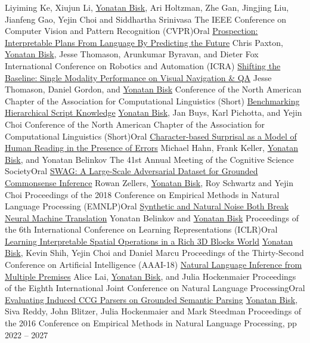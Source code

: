 \documentclass[10pt,letter]{moderncv}
\newcommand{\YB}{\underline{Yonatan Bisk}}
\begin{document}
  {Liyiming Ke, Xiujun Li, \YB{}, Ari Holtzman, Zhe Gan, Jingjing Liu, Jianfeng Gao, Yejin Choi and Siddhartha Srinivasa}
  {The IEEE Conference on Computer Vision and Pattern Recognition (CVPR)}{Oral}{}
\pub{--}
  {\href{https://arxiv.org/abs/1903.08309}{Prospection: Interpretable Plans From Language By Predicting the Future}}
  {Chris Paxton, \YB{}, Jesse Thomason, Arunkumar Byravan, and Dieter Fox}
  {International Conference on Robotics and Automation (ICRA)}{}{}
\pub{--}
  {\href{https://arxiv.org/abs/1811.00613}{Shifting the Baseline: Single Modality Performance on Visual Navigation \& QA}}
  {Jesse Thomason, Daniel Gordon, and \YB{}}
  {Conference of the North American Chapter of the Association for Computational Linguistics (Short)}{}{}
\pub{--}
  {\href{https://www.aclweb.org/anthology/N19-1412}{Benchmarking Hierarchical Script Knowledge}}
  {\YB{}, Jan Buys, Karl Pichotta, and Yejin Choi}
  {Conference of the North American Chapter of the Association for Computational Linguistics (Short)}{Oral}{}
\pub{--}
  {\href{https://arxiv.org/abs/1902.00595}{Character-based Surprisal as a Model of Human Reading in the Presence of Errors}}
  {Michael Hahn, Frank Keller, \YB{}, and Yonatan Belinkov}
  {The 41st Annual Meeting of the Cognitive Science Society}{Oral}{}
  {\href{http://rowanzellers.com/swag/}{SWAG: A Large-Scale Adversarial Dataset for Grounded Commonsense Inference}}
  {Rowan Zellers, \YB{}, Roy Schwartz and Yejin Choi}
  {Proceedings of the 2018 Conference on Empirical Methods in Natural Language Processing (EMNLP)}{Oral}{}
\pub{--}
  {\href{https://arxiv.org/abs/1711.02173}{Synthetic and Natural Noise Both Break Neural Machine Translation}}
  {Yonatan Belinkov and \YB{}}
  {Proceedings of the 6th International Conference on Learning Representations (ICLR)}{Oral}{}
\pub{--}
  {\href{http://yonatanbisk.com/papers/2018-AAAI.pdf}{Learning Interpretable Spatial Operations in a Rich 3D Blocks World}}
  {\YB{}, Kevin Shih, Yejin Choi and Daniel Marcu}
  {Proceedings of the Thirty-Second Conference on Artificial Intelligence (AAAI-18) }{}{}
  {\href{https://arxiv.org/abs/1710.02925}{Natural Language Inference from Multiple Premises}}
  {Alice Lai, \YB{}, and Julia Hockenmaier}
  {Proceedings of the Eighth International Joint Conference on Natural Language Processing}{Oral}{}
  {\href{http://yonatanbisk.com/papers/2016-EMNLP.pdf}{Evaluating Induced CCG Parsers on Grounded Semantic Parsing}}
{\YB{}, Siva Reddy, John Blitzer, Julia Hockenmaier and Mark Steedman}
  {Proceedings of the 2016 Conference on Empirical Methods in Natural Language Processing, pp 2022 -- 2027}{}{}
\end{document}
